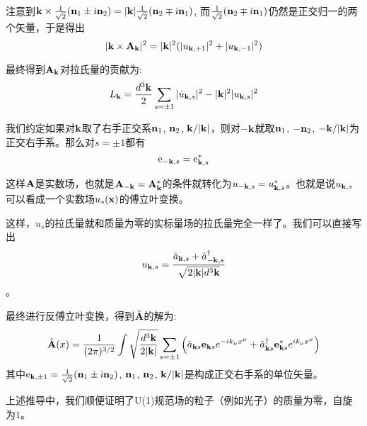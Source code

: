 \documentclass[CJK]{beamer}
\begin{document}
\begin{frame}
\bch
注意到${\mathbf{k}} \times \frac{1}{\sqrt{2}}({\mathbf{n}}_1\pm {\dot{\imath}}{\mathbf{n}}_2) =|{\mathbf{k}}|  \frac{1}{\sqrt{2}}({\mathbf{n}}_2 \mp {\dot{\imath}} {\mathbf{n}}_1)$, 而$ \frac{1}{\sqrt{2}}({\mathbf{n}}_2 \mp {\dot{\imath}} {\mathbf{n}}_1)$仍然是正交归一的两个矢量，于是得出
$$ |{\mathbf{k}} \times {\mathbf{A}}_{\mathbf{k}}|^2 = |{\mathbf{k}}|^2(|u_{{\mathbf{k}},+1}|^2 + |u_{{\mathbf{k}},-1}|^2)$$

最终得到${\mathbf{A}}_{\mathbf{k}}$对拉氏量的贡献为:
$$ L_{\mathbf{k}} = \frac{d^3{\mathbf{k}}}{2}\sum_{s=\pm 1}  |\dot u_{{\mathbf{k}},s}|^2  - |{\mathbf{k}}|^2 |u_{{\mathbf{k}},s}|^2$$

\ech
\end{frame}


\begin{frame}
\bch

我们约定如果对${\mathbf{k}}$取了右手正交系${\mathbf{n}}_1$, ${\mathbf{n}}_2$, ${\mathbf{k}}/|{\mathbf{k}}|$，则对$-{\mathbf{k}}$就取${\mathbf{n}}_1$, $-{\mathbf{n}}_2$, $-{\mathbf{k}}/|{\mathbf{k}}|$为正交右手系。那么对$s=\pm 1$都有
$$\mathrm{e}_{-{\mathbf{k}}, s}  = \mathrm{e}_{{\mathbf{k}}, s}^*$$

这样${\mathbf{A}}$是实数场，也就是${\mathbf{A}}_{-{\mathbf{k}}} = {\mathbf{A}}_{\mathbf{k}}^*$的条件就转化为$u_{-{\mathbf{k}}, s} = u_{{\mathbf{k}}, s}^*$。也就是说$u_{{\mathbf{k}}, s}$ 可以看成一个实数场$u_s({\mathbf{x}})$的傅立叶变换。
\ech
\end{frame}

\begin{frame}
\bch

这样，$u_s$的拉氏量就和质量为零的实标量场的拉氏量完全一样了。我们可以直接写出
$$ u_{{\mathbf{k}},s} = \frac{{\hat{a}}_{{\mathbf{k}},s} + {\hat{a}^\dagger}_{-{\mathbf{k}},s}}{\sqrt{2 |{\mathbf{k}}| d^3{\mathbf{k}}}}$$。

最终进行反傅立叶变换，得到$\hat{{\mathbf{A}}}$的解为:
$$\hat{{\mathbf{A}}}(x) = \frac{1}{(2\pi)^{3/2}} \int \sqrt{\frac{d^3{\mathbf{k}}}{2|{\mathbf{k}}|}} \sum_{s=\pm 1}\left({\hat{a}}_{{\mathbf{k}} s} \mathbf{e}_{{\mathbf{k}} s} e^{-ik_\mu x^\mu} + {\hat{a}^\dagger}_{{\mathbf{k}} s} \mathbf{e}^*_{{\mathbf{k}} s} e^{ik_\mu x^\mu}\right) $$
其中$\mathrm{e}_{{\mathbf{k}},\pm 1} = \frac{1}{\sqrt{2}}({\mathbf{n}}_1 \pm {\dot{\imath}} {\mathbf{n}}_2)$, ${\mathbf{n}}_1$, ${\mathbf{n}}_2$, ${\mathbf{k}}/|{\mathbf{k}}|$是构成正交右手系的单位矢量。 

\ech
\end{frame}

\begin{frame}
\bch
上述推导中，我们顺便证明了U(1)规范场的粒子（例如光子）的质量为零，自旋为$1$。
\ech
\end{frame}
\end{document}
